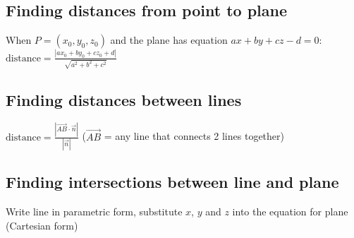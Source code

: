 \subsection{Finding distances from point to plane}
When $P=(x_0,y_0,z_0)$ and the plane has equation $ax+by+cz-d=0$:
\begin{math}\text{distance}=\frac{|ax_0+by_0+cz_0+d|}{\sqrt{a^2+b^2+c^2}}\end{math}
\subsection{Finding distances between lines}
$\text{distance}=\frac{|\overrightarrow{AB}\cdot\vec{n}|}{|\vec{n}|}$ ($\overrightarrow{AB}$ = any line that connects 2 lines together)
\subsection{Finding intersections between line and plane}
Write line in parametric form, substitute $x$, $y$ and $z$ into the equation for plane (Cartesian form)